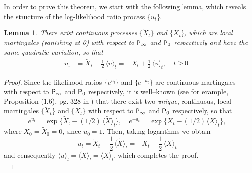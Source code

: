 \documentclass[11pt,reqno]{amsart}
\newtheorem{lemma}[theorem]{Lemma}
\theoremstyle{remark}
\begin{document}
In order to prove this theorem, we start with the following lemma, which reveals the structure of the log-likelihood ratio process $\{u_{t}\}$.

\begin{lemma} \label{L0}
There exist continuous processes  $\{\tilde{X}_{t}\}$ and $\{X_{t}\}$, which are local martingales (vanishing at 0) with respect to ${{\sf P}}_{\infty}$ and ${{\sf P}}_{0}$ respectively and have the same quadratic variation, so that
\begin{align*} 
u_{t} &= \tilde{X}_{t} -\frac{1}{2} \,  \langle u \rangle_{t} = -X_{t}+\frac{1}{2} \,  \langle u \rangle_{t}, \quad t \geq 0.
\end{align*}
\end{lemma}

\begin{proof}
Since the likelihood ratios $\{e^{u_{t}}\}$ and $\{e^{-u_{t}}\}$ are continuous martingales with respect to ${{\sf P}}_{\infty}$ and ${{\sf P}}_{0}$ respectively, 
it is well--known (see for example, Proposition (1.6), pg. 328 in \cite{yor}) that there exist two \textit{unique}, continuous, local martingales $\{\tilde{X}_{t}\}$ and $\{X_{t}\}$  with respect to ${{\sf P}}_{\infty}$ and ${{\sf P}}_{0}$ respectively,  so that 
\begin{equation*}
e^{u_{t}} = \exp \{ \tilde{X}_{t}- (1/2) \, \langle \tilde{X} \rangle_{t}\}, \quad  e^{-u_{t}} = \exp \{ X_{t} - (1/2) \, \langle X \rangle_{t}\},
\end{equation*}
where  $X_{0}=\tilde{X}_{0}=0$, since $u_{0}=1$. Then, taking logarithms  we obtain 
$$u_{t} = \tilde{X}_{t} -\frac{1}{2} \,  \langle \tilde{X} \rangle_{t} = -X_{t}+\frac{1}{2} \,  \langle X \rangle_{t}$$
and consequently 
$\langle u \rangle_{t}= \langle \tilde{X} \rangle_{t} =   \langle X \rangle_{t}$, which completes the proof. \\
\end{proof}
\end{document}
